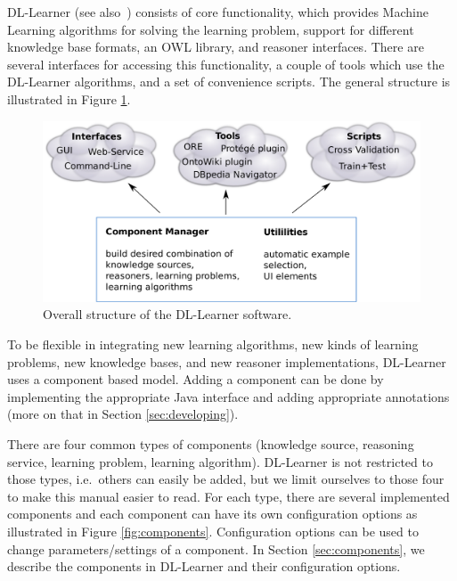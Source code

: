 \documentclass[a4paper,12pt]{scrartcl}
\begin{document}
DL-Learner (see also~\cite{dllearner_jmlr}) consists of core functionality, which provides Machine Learning algorithms for solving the learning problem, support for different knowledge base formats, an OWL library, and reasoner interfaces. There are several interfaces for accessing this functionality, a couple of tools which use the DL-Learner algorithms, and a set of convenience scripts. The general structure is illustrated in Figure \ref{fig:structure}.

\begin{figure}
 \includegraphics[width=\textwidth]{structure_print}
 \caption{Overall structure of the DL-Learner software.}
 \label{fig:structure}
\end{figure}

To be flexible in integrating new learning algorithms, new kinds of learning problems, new knowledge bases, and new reasoner implementations, DL-Learner uses a component based model. Adding a component can be done by implementing the appropriate Java interface and adding appropriate annotations (more on that in Section \ref{sec:developing}).

There are four common types of components (knowledge source, reasoning service, learning problem, learning algorithm). DL-Learner is not restricted to those types, i.e.~others can easily be added, but we limit ourselves to those four to make this manual easier to read. For each type, there are several implemented components and each component can have its own configuration options as illustrated in Figure \ref{fig:components}. Configuration options can be used to change parameters/settings of a component. In Section \ref{sec:components}, we describe the components in DL-Learner and their configuration options.
\end{document}

